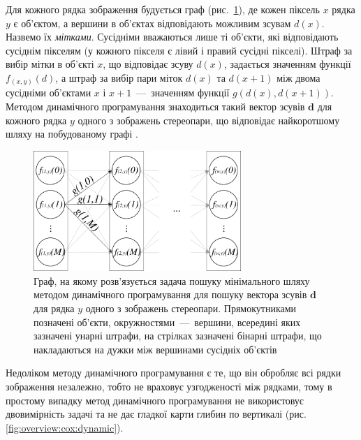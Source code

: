 Для кожного рядка зображення будується граф
(рис.~\ref{fig:dynamic:programming:graph}),
де кожен піксель $x$ рядка $y$ є об'єктом,
а вершини в об'єктах відповідають можливим зсувам $d \left(x \right)$.
Назвемо їх \textit{мітками}.
Сусідніми вважаються лише ті об'єкти, які відповідають сусіднім пікселям
(у кожного пікселя є лівий і правий сусідні пікселі).
Штраф за вибір мітки в об'єкті $x$, що відповідає зсуву $d \left(x \right)$,
задається значенням функції $f_{\left( x, y \right)} \left( d \right)$,
а штраф за вибір пари міток $d \left(x \right)$ та $d \left(x + 1 \right)$
між двома сусідніми об'єктами $x$ і $x + 1$~---~значенням функції
$g \left( d \left(x \right), d \left( x + 1 \right) \right)$.
Методом динамічного програмування знаходиться
такий вектор зсувів $\pmb{d}$ для кожного рядка $y$
одного з зображень стереопари,
що відповідає найкоротшому шляху на побудованому графі
\cite{overview:cox:dynamic}.

\begin{figure}[h]
  \centering
  \includegraphics[width=0.7\textwidth]{images/dynamic_programming_graph}
  \caption{Граф, на якому розв'язується задача пошуку мінімального
           шляху методом динамічного програмування для пошуку вектора зсувів
           $\pmb{d}$ для рядка $y$ одного з зображень стереопари.
           Прямокутниками позначені об'єкти, окружностями~---~вершини,
           всередині яких зазначені унарні штрафи,
           на стрілках зазначені бінарні штрафи,
           що накладаються на дужки між вершинами сусідніх об'єктів}
  \label{fig:dynamic:programming:graph}
\end{figure}

Недоліком методу динамічного програмування є те, що він обробляє всі
рядки зображення незалежно, тобто не враховує узгодженості між рядками,
тому в простому випадку метод динамічного програмування не використовує
двовимірність задачі та не дає гладкої карти
глибин по вертикалі (рис. \ref{fig:overview:cox:dynamic}).

